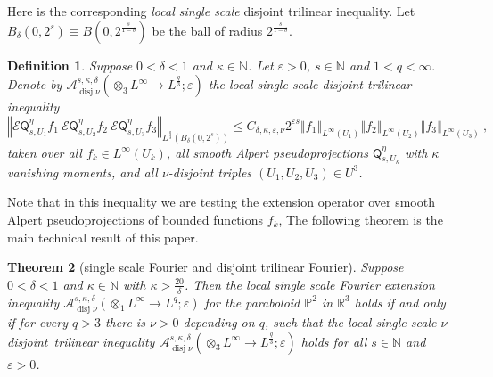 \documentclass{amsart}%
\newtheorem{theorem}{Theorem}
\theoremstyle{plain}
\newtheorem{definition}[theorem]{Definition}
\numberwithin{equation}{section}
\begin{document}
Here is the corresponding \emph{local single scale} disjoint trilinear
inequality. Let $B_{\delta}\left(  0,2^{s}\right)  \equiv B\left(
0,2^{\frac{s}{1-\delta}}\right)  $ be the ball of radius $2^{\frac{s}%
{1-\delta}}$.

\begin{definition}
Suppose $0<\delta<1$ and $\kappa\in\mathbb{N}$. Let $\varepsilon>0$,
$s\in\mathbb{N}$ and $1<q<\infty$. Denote by $\mathcal{A}%
_{\operatorname*{disj}\nu}^{s,\kappa,\delta}\left(  \otimes_{3}L^{\infty
}\rightarrow L^{\frac{q}{3}};\varepsilon\right)  $ the local single scale
disjoint trilinear inequality%
\[
\left\Vert \mathcal{E}\mathsf{Q}_{s,U_{1}}^{\eta}f_{1}\ \mathcal{E}%
\mathsf{Q}_{s,U_{2}}^{\eta}f_{2}\ \mathcal{E}\mathsf{Q}_{s,U_{3}}^{\eta}%
f_{3}\right\Vert _{L^{\frac{q}{3}}\left(  B_{\delta}\left(  0,2^{s}\right)
\right)  }\leq C_{\delta,\kappa,\varepsilon,\nu}2^{\varepsilon s}\left\Vert
f_{1}\right\Vert _{L^{\infty}\left(  U_{1}\right)  }\left\Vert f_{2}%
\right\Vert _{L^{\infty}\left(  U_{2}\right)  }\left\Vert f_{3}\right\Vert
_{L^{\infty}\left(  U_{3}\right)  }\ ,
\]
taken over all $f_{k}\in L^{\infty}\left(  U_{k}\right)  $, all smooth Alpert
pseudoprojections $\mathsf{Q}_{s,U_{k}}^{\eta}$ with $\kappa$ vanishing
moments, and all $\nu$-disjoint triples $\left(  U_{1},U_{2},U_{3}\right)  \in
U^{3}$.
\end{definition}

Note that in this inequality we are testing the extension operator over smooth
Alpert pseudoprojections of bounded functions $f_{k}$, The following theorem
is the main technical result of this paper.

\begin{theorem}
[single scale Fourier and disjoint trilinear Fourier]\label{without}Suppose
$0<\delta<1$ and $\kappa\in\mathbb{N}$ with $\kappa>\frac{20}{\delta}$. Then
the local single scale Fourier extension inequality $\mathcal{A}%
_{\operatorname*{disj}\nu}^{s,\kappa,\delta}\left(  \otimes_{1}L^{\infty
}\rightarrow L^{q};\varepsilon\right)  $ for the paraboloid $\mathbb{P}^{2}$
in $\mathbb{R}^{3}$ holds \emph{if and only if} for every $q>3$ there is
$\nu>0$ depending on $q$, such that the local single scale $\nu$%
-disjoint\emph{\ }trilinear inequality $\mathcal{A}_{\operatorname*{disj}\nu
}^{s,\kappa,\delta}\left(  \otimes_{3}L^{\infty}\rightarrow L^{\frac{q}{3}%
};\varepsilon\right)  $ holds for all $s\in\mathbb{N}$ and $\varepsilon>0$.
\end{theorem}
\end{document}
